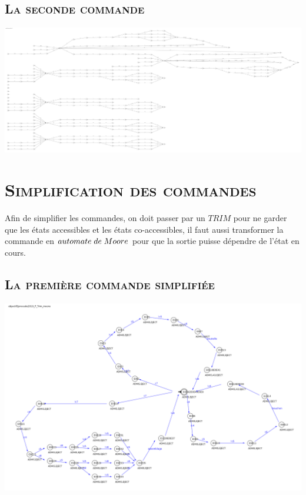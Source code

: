 		  \section{\textsc{La seconde commande}}
			
			\begin{center}
			\includegraphics[scale=0.07]{com2.png}
			\label{fig7}
			\end{center}		  
		  
		   \pagebreak
		 \chapter{\textsc{Simplification des commandes}}
		 
		 \par Afin de simplifier les commandes, on doit passer par un $TRIM$ pour ne garder que les états accessibles et les états co-accessibles, il faut aussi transformer la commande en $automate \hspace{1mm} de \hspace{1mm} Moore$ pour que la sortie puisse dépendre de l'état en cours.\\
		  
		 
		  \section{\textsc{La première commande simplifiée}}
		  
		    \begin{center}
			\includegraphics[scale=0.275]{com1s.png}
			\label{fig8}
			\end{center}	
			
